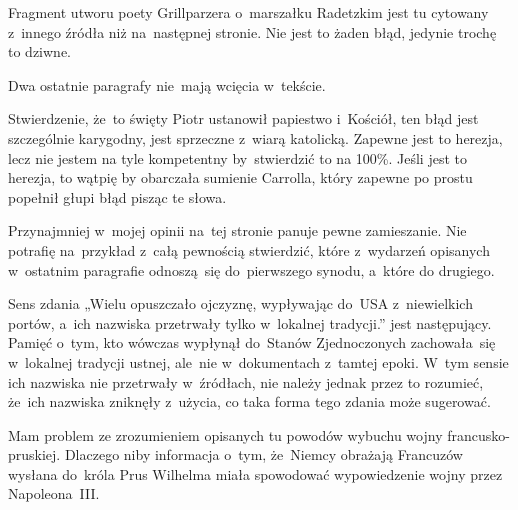 \documentclass[a4paper,11pt]{article}
\begin{document}
\VerSpaceFour





\noindent
{} Fragment utworu poety Grillparzera o~marszałku Radetzkim jest tu
cytowany z~innego źródła niż na~następnej stronie. Nie jest to żaden błąd,
jedynie trochę to dziwne.

\VerSpaceFour





\noindent
{} Dwa ostatnie paragrafy nie~mają wcięcia w~tekście.

\VerSpaceFour





\noindent
{} Stwierdzenie, że~to święty Piotr ustanowił papiestwo i~Kościół,
ten błąd jest szczególnie karygodny, jest sprzeczne z~wiarą katolicką.
Zapewne jest to herezja, lecz nie jestem na tyle kompetentny by~stwierdzić
to na 100\%. Jeśli jest to herezja, to wątpię by obarczała sumienie
Carrolla, który zapewne po prostu popełnił głupi błąd pisząc te słowa.

\VerSpaceFour





\noindent
{} Przynajmniej w~mojej opinii na~tej stronie panuje pewne
zamieszanie. Nie potrafię na~przykład z~całą pewnością
stwierdzić, które z~wydarzeń opisanych w~ostatnim paragrafie
odnoszą~się do~pierwszego synodu, a~które do drugiego.

\VerSpaceFour





\noindent
{} Sens zdania „Wielu opuszczało ojczyznę, wypływając
do~USA z~niewielkich portów, a~ich nazwiska przetrwały tylko w~lokalnej
tradycji.” jest następujący. Pamięć o~tym, kto wówczas wypłynął do~Stanów
Zjednoczonych zachowała~się w~lokalnej tradycji ustnej, ale~nie
w~dokumentach z~tamtej epoki. W~tym sensie ich nazwiska nie przetrwały
w~źródłach, nie należy jednak przez to rozumieć, że~ich nazwiska zniknęły
z~użycia, co taka forma tego zdania może sugerować.

\VerSpaceFour





\noindent
{} Mam problem ze zrozumieniem opisanych tu powodów wybuchu wojny
francusko-pruskiej. Dlaczego niby informacja o~tym, że~Niemcy obrażają
Francuzów wysłana do~króla Prus Wilhelma miała spowodować wypowiedzenie
wojny przez Napoleona~III.
\end{document}
